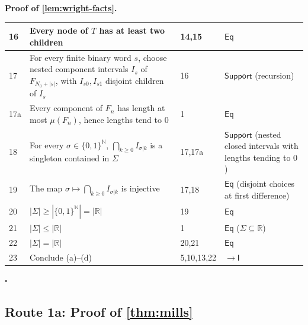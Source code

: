 \documentclass[11pt,reqno]{amsart}
\theoremstyle{blueplain}
\renewcommand{\qedsymbol}{\textcolor{proofqed}{\ensuremath{\square}}}
\renewenvironment{proof}[1][Proof]{\par\noindent\textbf{\textcolor{proofhead}{#1.}}\par\nobreak}{\par\nobreak\hfill\qedsymbol}
\numberwithin{equation}{section}
\begin{document}
\begin{proof}[\textbf{Proof of \cref{lem:wright-facts}}]
{\begin{tabular}{|m{0.7cm}|m{12cm}|m{1.4cm}|m{2.5cm}|}
			16 & Every node of \(T\) has at least two children & 14,15 & \(\mathsf{Eq}\) \\ \hline
			17 & For every finite binary word \(s\), choose nested component intervals \(I_s\) of \(F_{N_0+|s|}\), with \(I_{s0},I_{s1}\) disjoint children of \(I_s\) & 16 & \(\mathsf{Support}\) (recursion) \\ \hline
			17a & Every component of \(F_n\) has length at most \(\mu(F_n)\), hence lengths tend to \(0\) & 1 & \(\mathsf{Eq}\) \\ \hline
			18 & For every \(\sigma\in\{0,1\}^{\mathbb{N}}\), \(\bigcap_{k\ge0}I_{\sigma|k}\) is a singleton contained in \(\Sigma\) & 17,17a & \(\mathsf{Support}\) (nested closed intervals with lengths tending to \(0\)) \\ \hline
			19 & The map \(\sigma\mapsto \bigcap_{k\ge0}I_{\sigma|k}\) is injective & 17,18 & \(\mathsf{Eq}\) (disjoint choices at first difference) \\ \hline
			20 & \(|\Sigma|\ge|\{0,1\}^{\mathbb{N}}|=|\mathbb{R}|\) & 19 & \(\mathsf{Eq}\) \\ \hline
			21 & \(|\Sigma|\le|\mathbb{R}|\) & 1 & \(\mathsf{Eq}\) (\(\Sigma\subseteq\mathbb{R}\)) \\ \hline
			22 & \(|\Sigma|=|\mathbb{R}|\) & 20,21 & \(\mathsf{Eq}\) \\ \hline
			23 & Conclude (a)--(d) & 5,10,13,22 & \(\rightarrow\mathsf{I}\) \\ \hline
		\end{tabular}
	}
\end{proof}

\subsection{Route 1a: Proof of \cref{thm:mills}}
\end{document}
